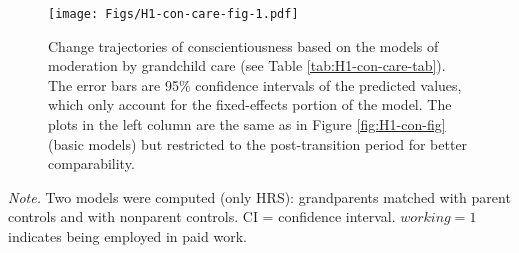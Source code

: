 \documentclass[
  english,
  man,floatsintext]{apa7}
\newenvironment{lltable}{\begin{landscape}\begin{center}\begin{ThreePartTable}}{\end{ThreePartTable}\end{center}\end{landscape}}
\begin{document}
\begin{figure}
\centering
\texttt{[image: Figs/H1-con-care-fig-1.pdf]}
\caption{\label{fig:H1-con-care-fig}Change trajectories of conscientiousness based on the models of moderation by grandchild care (see Table \ref{tab:H1-con-care-tab}). The error bars are 95\% confidence intervals of the predicted values, which only account for the fixed-effects portion of the model. The plots in the left column are the same as in Figure \ref{fig:H1-con-fig} (basic models) but restricted to the post-transition period for better comparability.}
\end{figure}




\begin{lltable}

\begin{TableNotes}[para]
\normalsize{\textit{Note.} Two models were computed (only HRS): grandparents matched with parent controls and with nonparent controls. CI = confidence interval. \(working=1\) indicates being employed in paid work.}
\end{TableNotes}

\footnotesize{

}
\end{lltable}
\end{document}
